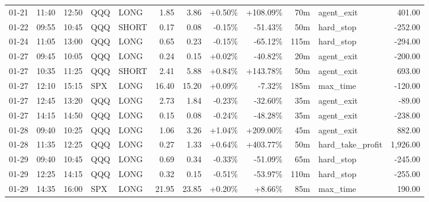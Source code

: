 \documentclass[11pt,a4paper,twoside]{article}
\begin{document}
\begin{center}
\begin{longtable}{>{\color{txtmain}}l l l l l r r r r r >{\color{txtmain}}l r}
01-21 & 11:40 & 12:50 & QQQ & LONG & 1.85 & 3.86 & \textcolor{wingreen}{+0.50\%} & \textcolor{wingreen}{+108.09\%} & 70m & agent\_exit & \textcolor{wingreen}{401.00} \\
01-22 & 09:55 & 10:45 & QQQ & SHORT & 0.17 & 0.08 & \textcolor{lossred}{-0.15\%} & \textcolor{lossred}{-51.43\%} & 50m & hard\_stop & \textcolor{lossred}{-252.00} \\
01-24 & 11:05 & 13:00 & QQQ & LONG & 0.65 & 0.23 & \textcolor{lossred}{-0.15\%} & \textcolor{lossred}{-65.12\%} & 115m & hard\_stop & \textcolor{lossred}{-294.00} \\
01-27 & 09:45 & 10:05 & QQQ & LONG & 0.24 & 0.15 & \textcolor{wingreen}{+0.02\%} & \textcolor{lossred}{-40.82\%} & 20m & agent\_exit & \textcolor{lossred}{-200.00} \\
01-27 & 10:35 & 11:25 & QQQ & SHORT & 2.41 & 5.88 & \textcolor{wingreen}{+0.84\%} & \textcolor{wingreen}{+143.78\%} & 50m & agent\_exit & \textcolor{wingreen}{693.00} \\
01-27 & 12:10 & 15:15 & SPX & LONG & 16.40 & 15.20 & \textcolor{wingreen}{+0.09\%} & \textcolor{lossred}{-7.32\%} & 185m & max\_time & \textcolor{lossred}{-120.00} \\
01-27 & 12:45 & 13:20 & QQQ & LONG & 2.73 & 1.84 & \textcolor{lossred}{-0.23\%} & \textcolor{lossred}{-32.60\%} & 35m & agent\_exit & \textcolor{lossred}{-89.00} \\
01-27 & 14:15 & 14:50 & QQQ & LONG & 0.15 & 0.08 & \textcolor{lossred}{-0.24\%} & \textcolor{lossred}{-48.28\%} & 35m & agent\_exit & \textcolor{lossred}{-238.00} \\
01-28 & 09:40 & 10:25 & QQQ & LONG & 1.06 & 3.26 & \textcolor{wingreen}{+1.04\%} & \textcolor{wingreen}{+209.00\%} & 45m & agent\_exit & \textcolor{wingreen}{882.00} \\
01-28 & 11:35 & 12:25 & QQQ & LONG & 0.27 & 1.33 & \textcolor{wingreen}{+0.64\%} & \textcolor{wingreen}{+403.77\%} & 50m & hard\_take\_profit & \textcolor{wingreen}{1,926.00} \\
01-29 & 09:40 & 10:45 & QQQ & LONG & 0.69 & 0.34 & \textcolor{lossred}{-0.33\%} & \textcolor{lossred}{-51.09\%} & 65m & hard\_stop & \textcolor{lossred}{-245.00} \\
01-29 & 12:25 & 14:15 & QQQ & LONG & 0.32 & 0.15 & \textcolor{lossred}{-0.51\%} & \textcolor{lossred}{-53.97\%} & 110m & hard\_stop & \textcolor{lossred}{-255.00} \\
01-29 & 14:35 & 16:00 & SPX & LONG & 21.95 & 23.85 & \textcolor{wingreen}{+0.20\%} & \textcolor{wingreen}{+8.66\%} & 85m & max\_time & \textcolor{wingreen}{190.00} \\

\end{longtable}
\end{center}
\end{document}
